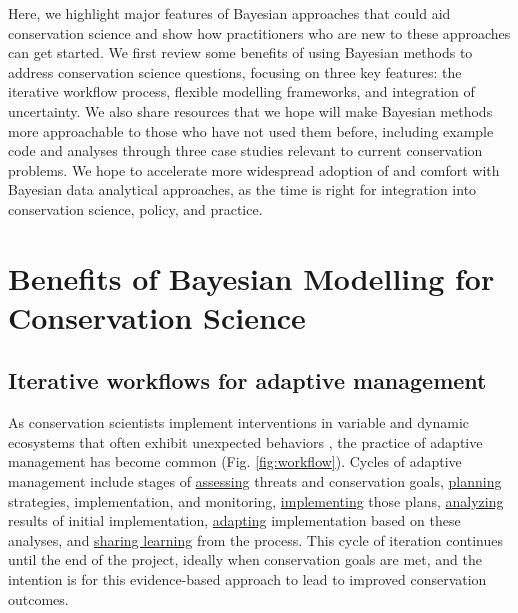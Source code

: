 \documentclass{article}
\begin{document}
Here, we highlight major features of Bayesian approaches that could aid conservation science and show how practitioners who are new to these approaches can get started. We first review some benefits of using Bayesian methods to address conservation science questions, focusing on three key features: the iterative workflow process, flexible modelling frameworks, and integration of uncertainty. We also share resources that we hope will make Bayesian methods more approachable to those who have not used them before, including example code and analyses through three case studies relevant to current conservation problems.
We hope to accelerate more widespread adoption of and comfort with Bayesian data analytical approaches, as the time is right for integration into conservation science, policy, and practice. 

\section* {Benefits of Bayesian Modelling for Conservation Science}
\subsection*{Iterative workflows for adaptive management}
\par As conservation scientists implement interventions in variable and dynamic ecosystems that often exhibit unexpected behaviors \citep{Levin2012,Gross2013}, the practice of adaptive management has become common \citep{holling1978adaptive} (Fig. \ref{fig:workflow}). Cycles of adaptive management include stages of \underline{assessing} threats and conservation goals, \underline{planning} strategies, implementation, and monitoring, \underline{implementing} those plans, \underline{analyzing} results of initial implementation, \underline{adapting} implementation based on these analyses, and \underline{sharing learning} from the process. This cycle of iteration continues until the end of the project, ideally when conservation goals are met, and the intention is for this evidence-based approach to lead to improved conservation outcomes. %
\end{document}

